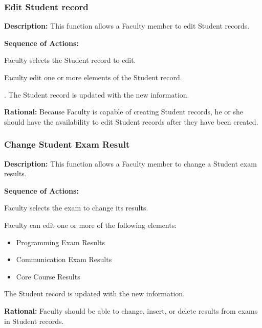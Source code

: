    \subsubsection{\large Edit Student record} 
   \begin{boxed} %
      \textbf{Description:}
      {\small This function allows a Faculty member to edit Student records.}
         
         \textbf{Sequence of Actions:}
         \begin{enumerate}
               {\small
            \item Faculty selects the Student record to edit.
            \item Faculty edit one or more elements of the Student record.
            \item. The Student record is updated with the new information.}
      \end{enumerate}

         \textbf{Rational:}
         {\small Because Faculty is capable of creating Student records, he or she
         should have the availability to edit Student records after they have
      been created.}
   \end{boxed} %

   \subsubsection{\large Change Student Exam Result} 
   \begin{boxed} %
      \textbf{Description:}
      {\small This function allows a Faculty member to change a Student exam
         results.}
         
         \textbf{Sequence of Actions:}
         \begin{enumerate}
               {\small
            \item Faculty selects the exam to change its results.
            \item Faculty can edit one or more of the following elements:
            \begin{itemize}
               \item Programming Exam Results
               \item Communication Exam Results
               \item Core Course Results
            \end{itemize}
         \item The Student record is updated with the new information.}
      \end{enumerate}

         \textbf{Rational:}
         {\small Faculty should be able to change, insert, or delete results from exams
         in Student records.}
   \end{boxed} %

